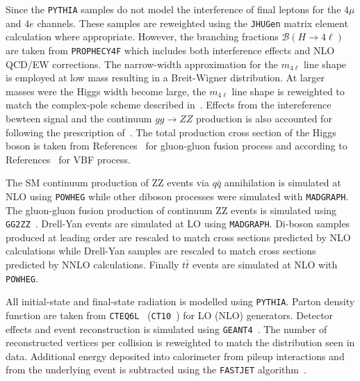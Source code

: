 Since the \verb+PYTHIA+ samples do not model the interference
of final leptons for the $4\mu$ and $4e$ channels.  These samples
are reweighted using the \verb+JHUGen+ matrix element calculation where
appropriate.  However, the branching fractions 
$\mathscr{B}(H\to 4\ell)$ are taken from \verb+PROPHECY4F+ which 
includes both interference effects and NLO QCD/EW corrections. 
The narrow-width approximation for the $m_{4\ell}$
line shape is employed at low mass resulting in a Breit-Wigner
distribution.  At larger masses were the Higgs width become large,
the $m_{4\ell}$ line shape is reweighted to match the complex-pole
scheme described in~\cite{Passarino:2010qk,Goria:2011wa,Kauer:2013cga}.  Effects from the intereference
bewteen signal and the continuum $gg\to ZZ$ production is also 
accounted for following the prescription of~\cite{Passarino:2012ri}.
The total production cross section of the Higgs boson is taken from
References~\cite{Anastasiou:2008tj,deFlorian:2009hc,Baglio:2010ae,Dittmaier:2011ti,Djouadi:1991tka,Dawson:1990zj,Spira:1995rr,Harlander:2002wh,Anastasiou:2002yz,Ravindran:2003um,Catani:2003zt,Actis:2008ug} 
for gluon-gluon fusion process and according to 
References~\cite{Dittmaier:2011ti,Ciccolini:2007jr,Ciccolini:2007ec,Figy:2003nv,Arnold:2008rz,Bolzoni:2010xr} 
for VBF process.

The SM continuum production of ZZ events via $q\bar{q}$
annihilation is simulated at NLO using \verb+POWHEG+ while
other diboson processes were simulated with 
\verb+MADGRAPH+\cite{Alwall:2007st}.
The gluon-gluon
fusion production of continuum ZZ events is simulated using
\verb+GG2ZZ+~\cite{Binoth:2008pr}. Drell-Yan events  are 
simulated at LO using \verb+MADGRAPH+.  
Di-boson samples produced at leading order are rescaled to match
cross sections predicted by NLO calculations while Drell-Yan 
samples are rescaled to match cross sections predicted by NNLO
calculations.  Finally $t\bar{t}$ events are simulated at NLO
with \verb+POWHEG+.

All initial-state and final-state radiation is modelled using 
\verb+PYTHIA+. Parton density function are taken from 
\verb+CTEQ6L+~\cite{Lai:2010nw} (\verb+CT10+~\cite{Lai:2010vv}) 
for LO (NLO) 
generators.  Detector effects and event reconstruction is 
simulated using \verb+GEANT4+~\cite{Allison:2006ve}.  The number 
of reconstructed vertices per collision is reweighted to match 
the distribution seen in data.  Additional energy deposited into
calorimeter from pileup interactions and from the underlying
event is subtracted using the \verb+FASTJET+ algorithm~\cite{Cacciari:2007fd,Cacciari:2008gn,Cacciari:2011ma}. 

